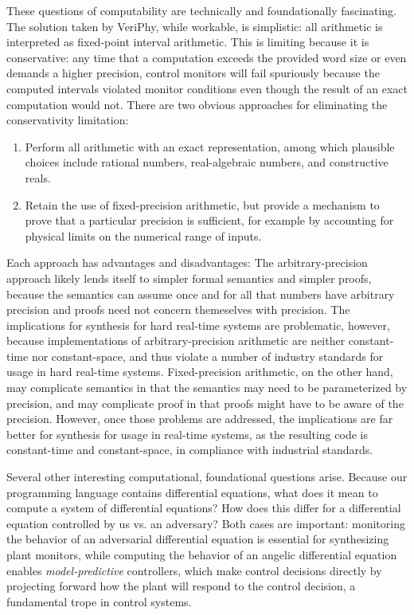\documentclass[12pt]{cmuthesis}
\theoremstyle{definition}
\theoremstyle{remark}
\newcommand{\VeriPhy}{VeriPhy\xspace}
\begin{document}
These questions of computability are technically and foundationally fascinating.
The solution taken by \VeriPhy, while workable, is simplistic: all arithmetic is interpreted as fixed-point interval arithmetic.
This is limiting because it is conservative: any time that a computation exceeds the provided word size or even demands a higher precision, control monitors will fail spuriously because the computed intervals violated monitor conditions even though the result of an exact computation would not.
There are two obvious approaches for eliminating the conservativity limitation:
\begin{enumerate}
\item Perform all arithmetic with an exact representation, among which plausible choices include rational numbers, real-algebraic numbers, and constructive reals.
\item Retain the use of fixed-precision arithmetic, but provide a mechanism to prove that a particular precision is sufficient, for example by accounting for physical limits on the numerical range of inputs.
\end{enumerate}
Each approach has advantages and disadvantages: The arbitrary-precision approach likely lends itself to simpler formal semantics and simpler proofs, because the semantics can assume once and for all that numbers have arbitrary precision and proofs need not concern themeselves with precision.
The implications for synthesis for hard real-time systems are problematic, however, because implementations of arbitrary-precision arithmetic are neither constant-time nor constant-space, and thus violate a number of industry standards for usage in hard real-time systems.
Fixed-precision arithmetic, on the other hand, may complicate semantics in that the semantics may need to be parameterized by precision, and may complicate proof in that proofs might have to be aware of the precision.
However, once those problems are addressed, the implications are far better for synthesis for usage in real-time systems, as the resulting code is constant-time and constant-space, in compliance with industrial standards.

Several other interesting computational, foundational questions arise.
Because our programming language contains differential equations, what does it mean to compute a system of differential equations?
How does this differ for a differential equation controlled by us vs. an adversary?
Both cases are important: monitoring the behavior of an adversarial differential equation is essential for synthesizing plant monitors, while computing the behavior of an angelic differential equation enables \emph{model-predictive} controllers, which make control decisions directly by projecting forward how the plant will respond to the control decision, a fundamental trope in control systems.
\end{document}
